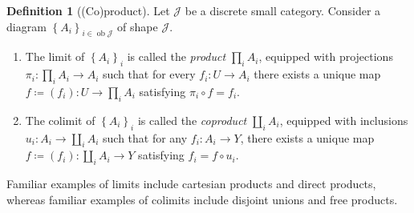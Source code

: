 \documentclass[10pt,letterpaper,cm]{nupset}
\theoremstyle{definition}
\newtheorem{definition}{Definition}[section]
\theoremstyle{theorem}
\theoremstyle{remark}
\newcommand{\1}{\mathbf{1}}
\renewcommand{\j}{\mathscr{J}}
\newcommand{\0}{\vec 0}
\DeclareMathOperator{\ob}{ob}
\begin{document}
\begin{definition}[(Co)product]
Let $\j$ be a discrete small category. Consider a diagram  $\left\{A_i\right\}_{i\in \ob{\j}}$ of shape $\j$. 
\begin{enumerate}
\item The limit of $\left\{A_i\right\}_i$ is called the \textit{product} $\prod_i A_i$, equipped with projections $\pi_i : \prod_i A_i \to A_i$ such that for every $f_{i} : U \to A_i$ there exists a unique map $f\coloneqq \left(f_i\right) : U \to \prod_i A_i$ satisfying $\pi_i \circ f = f_i$. 
\item  The colimit of $\left\{A_i\right\}_i$ is called the \textit{coproduct} $\coprod_i A_i$, equipped with inclusions $u_i : A_i \to \coprod_i A_i$ such that for any $f_i : A_i \to Y$, there exists a unique map $f\coloneqq \left(f_i\right) : \coprod_i A_i \to Y$ satisfying $f_i = f \circ u_i$.
\end{enumerate}
\end{definition}

\smallskip

Familiar examples of limits include cartesian products and direct products, whereas familiar examples of colimits include disjoint unions and free products. 
\end{document}
